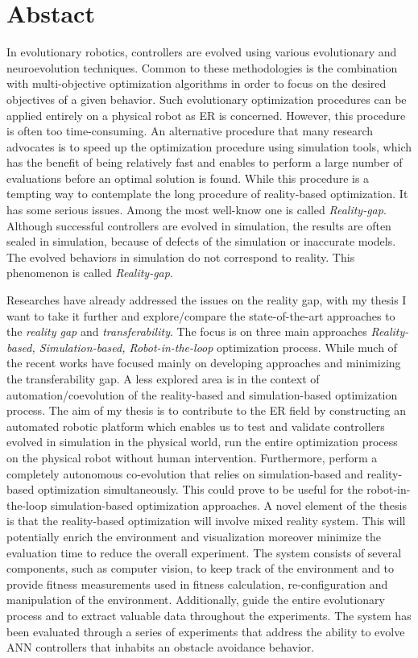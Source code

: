 \cleardoublepage
\chapter*{Abstact}

\thispagestyle{empty}
\vspace{1cm}

In evolutionary robotics,  controllers are evolved using various evolutionary and neuroevolution techniques. Common to these methodologies is the combination with multi-objective optimization algorithms in order to focus on the desired objectives of a given behavior. Such evolutionary optimization procedures can be applied entirely on a physical robot as ER is concerned. However, this procedure is often too time-consuming. An alternative procedure that many research advocates  is to speed up the optimization procedure using simulation tools, which has the benefit of being relatively fast and enables to perform a large number of evaluations before an optimal solution is found. While this procedure is a tempting way to contemplate the long procedure of reality-based optimization. It has some serious issues. Among the most well-know one is called \emph{Reality-gap}. Although successful controllers are evolved in simulation, the results are often sealed in simulation, because of defects of the simulation or inaccurate models. The evolved behaviors in simulation do not correspond to reality. This phenomenon is called \emph{Reality-gap}.

Researches have already addressed the issues on the reality gap, with my thesis I want to take it further and explore/compare the state-of-the-art approaches to the \emph{reality gap} and \emph{transferability}. The focus is on three main approaches \emph{Reality-based, Simulation-based, Robot-in-the-loop} optimization process. While much of the recent works have focused mainly on developing approaches and minimizing the transferability gap. A less explored area is in the context of automation/coevolution of the reality-based and simulation-based optimization process. The aim of my thesis is to contribute to the ER field by constructing an automated robotic platform which enables us to test and validate controllers evolved in simulation in the physical world, run the entire optimization process on the physical robot without human intervention. Furthermore, perform a completely autonomous co-evolution that relies on simulation-based and reality-based optimization simultaneously. This could prove to be useful for the robot-in-the-loop simulation-based optimization approaches. A novel element of the thesis is that the reality-based optimization will involve mixed reality system. This will potentially enrich the environment and visualization moreover minimize the evaluation time to reduce the overall experiment. The system consists of several components, such as computer vision, to keep track of the environment and to provide fitness measurements used in fitness calculation, re-configuration and manipulation of the environment. Additionally, guide the entire evolutionary process and to extract valuable data throughout the experiments. The system has been evaluated through a series of experiments that address the ability to evolve ANN controllers that inhabits an obstacle avoidance behavior.